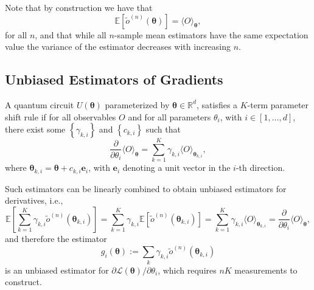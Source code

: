 \documentclass[
        11pt, %
	a4paper, %
]{LegrandOrangeBook}
\begin{document}
Note that by construction we have that
\begin{equation}
    \mathbb{E}\left[\tilde{o}^{(n)}(\boldsymbol{\theta})\right]=\langle O\rangle_{\boldsymbol{\theta}},
\end{equation}
for all $n$, and that while all $n$-sample mean estimators have the same expectation value the variance of the estimator decreases with increasing $n$. 

\subsection{Unbiased Estimators of Gradients}

\begin{definition}
    A quantum circuit $U(\boldsymbol{\theta})$ parameterized by $\boldsymbol{\theta} \in \mathbb{R}^d$, satisfies a $K$-term parameter shift rule if for all observables $O$ and for all parameters $\theta_i$, with $i \in[1, \ldots, d]$, there exist some $\left\{\gamma_{k, i}\right\}$ and $\left\{c_{k, i}\right\}$ such that
    \begin{equation}
    \frac{\partial}{\partial \theta_i}\langle O\rangle_{\boldsymbol{\theta}}=\sum_{k=1}^K \gamma_{k, i}\langle O\rangle_{\boldsymbol{\theta}_{k, i}},
\end{equation}
where $\boldsymbol{\theta}_{k, i}=\boldsymbol{\theta}+c_{k, i} \boldsymbol{e}_i$, with $\boldsymbol{e}_i$ denoting a unit vector in the $i$-th direction.
\end{definition}

Such estimators can be linearly combined to obtain unbiased estimators for derivatives, i.e.,
\begin{equation}
    \mathbb{E}\left[\sum_{k=1}^K \gamma_{k, i} \tilde{o}^{(n)}\left(\boldsymbol{\theta}_{k, i}\right)\right]=\sum_{k=1}^K \gamma_{k, i} \mathbb{E}\left[\tilde{o}^{(n)}\left(\boldsymbol{\theta}_{k, i}\right)\right]=\sum_{k=1}^K \gamma_{k, i}\langle O\rangle_{\boldsymbol{\theta}_{k, i}}=\frac{\partial}{\partial \theta_i}\langle O\rangle_{\boldsymbol{\theta}},
\end{equation}
and therefore the estimator 
\begin{equation}
    g_i(\boldsymbol{\theta}):=\sum_k \gamma_{k, i} \tilde{o}^{(n)}\left(\boldsymbol{\theta}_{k, i}\right)
\end{equation}
is an unbiased estimator for $\partial \mathcal{L}(\boldsymbol{\theta}) / \partial \theta_i$, which requires $n K$ measurements to construct. 
\end{document}
